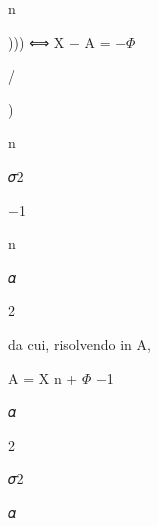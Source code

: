 \documentclass[a4paper,portrait,12pt]{article}
\begin{document}
\begin{flushleft}
n
\end{flushleft}





\begin{flushleft}
))) ⟺ X $-$ A = $-$$\Phi$
\end{flushleft}


/


)


\begin{flushleft}
n
\end{flushleft}





\begin{flushleft}
𝜎2
\end{flushleft}





$-$1





\begin{flushleft}
n
\end{flushleft}





\begin{flushleft}
𝛼
\end{flushleft}


2





\begin{flushleft}
da cui, risolvendo in A,
\end{flushleft}


\begin{flushleft}
A = X n + $\Phi$ $-$1
\end{flushleft}





\begin{flushleft}
𝛼
\end{flushleft}


2





\begin{flushleft}
𝜎2
\end{flushleft}


\begin{flushleft}
𝛼
\end{flushleft}
\end{document}
